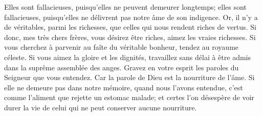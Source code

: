 Elles sont fallacieuses, puisqu’elles ne peuvent demeurer longtemps;
	elles sont fallacieuses,
		puisqu’elles ne délivrent pas notre âme de son indigence.
Or, il n’y a de véritables, parmi les richesses,
	que celles qui nous rendent riches de vertus.
Si donc, mes très chers frères, vous désirez être riches,
	aimez les vraies richesses.
	Si vous cherchez à parvenir au faîte du véritable bonheur,
	tendez au royaume céleste.
Si vous aimez la gloire et les dignités,
	travaillez sans délai à être admis dans la suprême assemblée des anges.
Gravez en votre esprit les paroles du Seigneur que vous entendez.
	Car la parole de Dieu est la nourriture de l’âme.
Si elle ne demeure pas dans notre mémoire, quand nous l’avons entendue,
	c’est comme l’aliment que rejette un estomac malade;
	et certes l’on désespère de voir durer la vie
	de celui qui ne peut conserver aucune nourriture.
